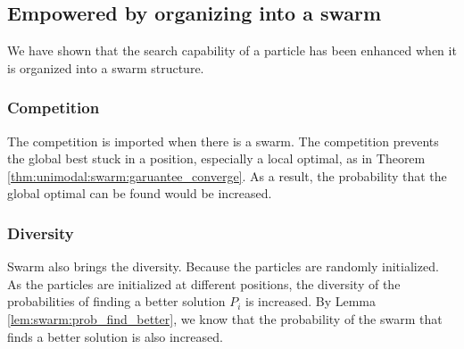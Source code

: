 \subsection{Empowered by organizing into a swarm}




We have shown that the search capability of a particle has been enhanced when it is organized into a swarm structure.

\subsubsection{Competition}

The competition is imported when there is a swarm.
The competition prevents the global best stuck in a position, especially a local optimal, as in Theorem \ref{thm:unimodal:swarm:garuantee_converge}.
As a result, the probability that the global optimal can be found would be increased.

\subsubsection{Diversity}

Swarm also brings the diversity.
Because the particles are randomly initialized.
As the particles are initialized at different positions, the diversity of the probabilities of finding a better solution $ P_{i} $ is increased.
By Lemma \ref{lem:swarm:prob_find_better}, we know that the probability of the swarm that finds a better solution is also increased.

